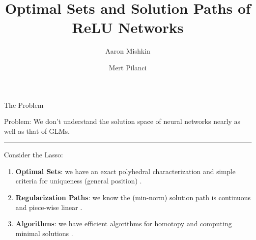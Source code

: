 \documentclass[usenames,dvipsnames,mathserif,notheorems]{beamer}
\title{Optimal Sets and Solution Paths of ReLU Networks}
\author{Aaron Mishkin \and Mert Pilanci}
\institute{ICML 2023}
\date{}
\newcommand{\horizontalrule}{
	{
			\vspace{-0.5em}
			\center \rule{\textwidth}{0.1em}
			\vspace{-0.2em}
		}
}
\newcommand{\bad}[1]{\textcolor{bad}{#1}}
\newcommand{\good}[1]{\textcolor{good}{#1}}
\begin{document}
\maketitle

\begin{frame}{The Problem}

	{
		\large \bad{Problem}: We don't understand the solution space of
		neural networks nearly as well as that of \good{GLMs}.
	}

	\pause
	\vspace{0.5em}
	\horizontalrule
	\vspace{0.5em}

	{
		\large
		Consider the Lasso:
	}

	\pause
	\vspace{0.5em}

	\begin{enumerate}
		\item \textbf{Optimal Sets}: we have an exact \good{polyhedral
			      characterization} and simple criteria for \good{uniqueness}
		      (general position) \citep{tibshirani2013unique}.
		      \pause

		\item \textbf{Regularization Paths}: we know the (min-norm) solution
		      path is \good{continuous} and \good{piece-wise linear}
		      \citep{osborne2000new}.
		      \pause

		\item \textbf{Algorithms}: we have efficient algorithms for
		      \good{homotopy} \citep{efron2004least} and computing \good{minimal
			      solutions} \citep{tibshirani2013unique}.
	\end{enumerate}

\end{frame}
\end{document}
